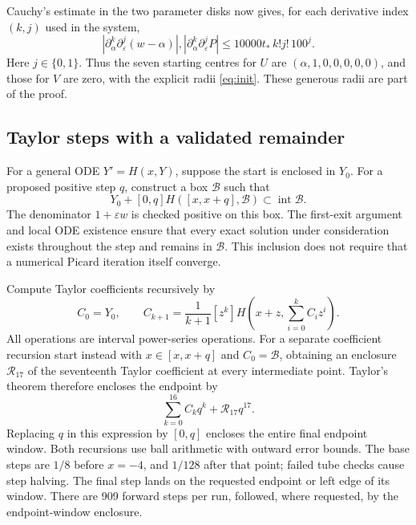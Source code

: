 \documentclass[11pt,a4paper]{report}
\begin{document}
Cauchy's estimate in the two parameter disks now gives, for each derivative
index $(k,j)$ used in the system,
\begin{equation}\label{eq:init}
 \left|\partial_\alpha^k\partial_\varepsilon^j(w-\alpha)\right|,
 \left|\partial_\alpha^k\partial_\varepsilon^jP\right|
 \leq 10000t_*\,k!j!\,100^j.
\end{equation}
Here $j\in\{0,1\}$. Thus the seven starting centres for $U$ are
$(\alpha,1,0,0,0,0,0)$, and those for $V$ are zero, with the explicit radii
\eqref{eq:init}. These generous radii are part of the proof.

\subsection{Taylor steps with a validated remainder}
For a general ODE $Y'=H(x,Y)$, suppose the start is enclosed in $Y_0$.
For a proposed positive step $q$, construct a box $\mathcal B$ such that
\begin{equation}\label{eq:tube}
 Y_0+[0,q]H([x,x+q],\mathcal B)\subset\operatorname{int}\mathcal B.
\end{equation}
The denominator $1+\varepsilon w$ is checked positive on this box.
The first-exit argument and local ODE existence ensure that every exact
solution under consideration exists throughout the step and remains in
$\mathcal B$. This inclusion does not require that a numerical Picard
iteration itself converge.

Compute Taylor coefficients recursively by
\[
 C_0=Y_0,\qquad
 C_{k+1}=\frac1{k+1}[z^k]H\left(x+z,\sum_{i=0}^kC_i z^i\right).
\]
All operations are interval power-series operations. For a separate
coefficient recursion start instead with $x\in[x,x+q]$ and
$C_0=\mathcal B$, obtaining an enclosure $\mathcal R_{17}$ of the
seventeenth Taylor coefficient at every intermediate point.
Taylor's theorem therefore encloses the endpoint by
\begin{equation}\label{eq:taylor}
 \sum_{k=0}^{16}C_kq^k+\mathcal R_{17}q^{17}.
\end{equation}
Replacing $q$ in this expression by $[0,q]$ encloses the entire final
endpoint window. Both recursions use ball arithmetic with outward error bounds.
The base steps are $1/8$ before $x=-4$, and $1/128$ after that point;
failed tube checks cause step halving. The final step lands on the requested
endpoint or left edge of its window. There are 909 forward steps per run,
followed, where requested, by the endpoint-window enclosure.
\end{document}
